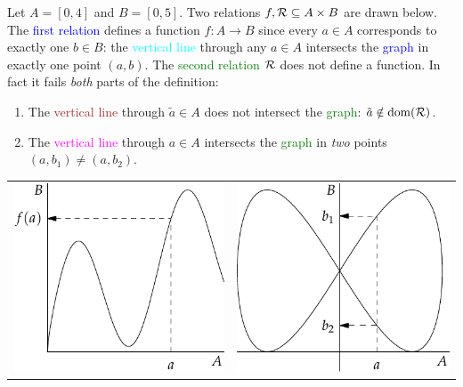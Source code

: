 \begin{example}{}{}
	Let $A=[0,4]$ and $B=[0,5]$. Two relations $f,\mathcal{R}\subseteq A\times B$ are drawn below.\smallbreak
	The \textcolor{blue}{first relation} defines a function $f:A\to B$ since every $a\in A$ corresponds to exactly one $b\in B$: the \textcolor{cyan}{vertical line} through any $a\in A$ intersects the \textcolor{blue}{graph} in exactly one point $(a,b)$.\smallbreak
	The \textcolor{Green}{second relation} $\mathcal{R}$ does not define a function. In fact it fails \emph{both} parts of the definition:
	\begin{enumerate}\itemsep0pt
	  \item The \textcolor{Brown}{vertical line} through $\tilde a\in A$ does not intersect the \textcolor{Green}{graph}: $\tilde a\notin\operatorname{dom}(\mathcal{R})$.
	  \item The \textcolor{Magenta}{vertical line} through $a\in A$ intersects the \textcolor{Green}{graph} in \emph{two} points $(a,b_1)\neq (a,b_2)$.
	\end{enumerate}
	\begin{center}
	\begin{tabular}{c@{\qquad\qquad}c}
		\includegraphics{relations-05-funcvert}
		&
		\includegraphics{relations-06-funcvert}
	\end{tabular}
	\end{center}
\end{example}

